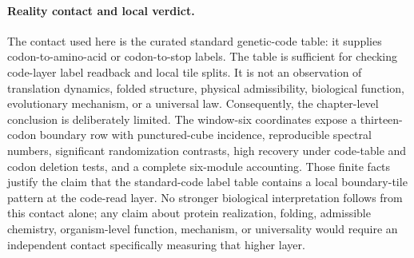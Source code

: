 \paragraph{Reality contact and local verdict.}
The contact used here is the curated standard genetic-code table: it supplies codon-to-amino-acid or codon-to-stop labels.  The table is sufficient for checking code-layer label readback and local tile splits.  It is not an observation of translation dynamics, folded structure, physical admissibility, biological function, evolutionary mechanism, or a universal law.  Consequently, the chapter-level conclusion is deliberately limited.  The window-six coordinates expose a thirteen-codon boundary row with punctured-cube incidence, reproducible spectral numbers, significant randomization contrasts, high recovery under code-table and codon deletion tests, and a complete six-module accounting.  Those finite facts justify the claim that the standard-code label table contains a local boundary-tile pattern at the code-read layer.  No stronger biological interpretation follows from this contact alone; any claim about protein realization, folding, admissible chemistry, organism-level function, mechanism, or universality would require an independent contact specifically measuring that higher layer.